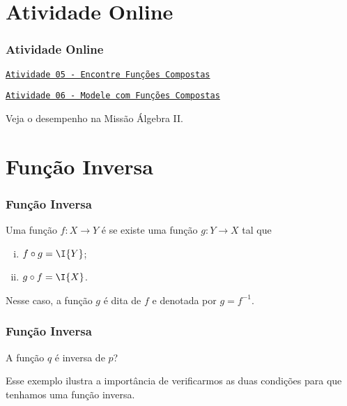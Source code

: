 \documentclass[10pt]{beamer}
\begin{document}
\section{Atividade Online}
\begin{frame}
\frametitle{Atividade Online} 

\href{https://pt.khanacademy.org/math/algebra2/manipulating-functions/function-composition/e/compose-functions}
{{\tt Atividade 05 - Encontre Funções Compostas}}

\href{https://pt.khanacademy.org/math/algebra2/manipulating-functions/combining-and-composing-modeling-functions/e/modeling-with-composite-functions}
{{\tt Atividade 06 - Modele com Funções Compostas}}


Veja o desempenho na Missão Álgebra II.


\end{frame}



\section{Função Inversa}
\begin{frame}
\frametitle{Função Inversa} 

\begin{definicao}\label{funinv}
Uma função $f: X \to Y$ é  se existe uma função $g:
Y \to X$ tal que
\begin{enumerate}[(i)]
	\item $f \circ g = \I{Y}$;
	\item $g \circ f = \I{X}$.
\end{enumerate}
Nesse caso, a função $g$ é dita  de $f$ e
denotada por $g = f^{-1}$.
\end{definicao}

\end{frame}





\begin{frame}
\frametitle{Função Inversa} 

\begin{exemplo}
A função $q$ é inversa de $p$?
\end{exemplo}\pause
 Esse exemplo ilustra a importância de verificarmos as duas
 condições para que tenhamos uma função inversa.

\end{frame}
\end{document}
